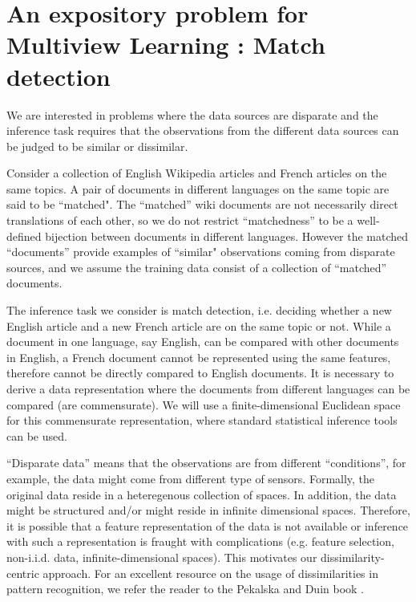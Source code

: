 \documentclass[12pt,oneside,final]{thesis}\usepackage[]{graphicx}\usepackage[]{color}
\begin{document}
\chapter{An expository problem for Multiview Learning : Match detection}
\label{sec:match detection}

 We are interested in problems where the data sources are disparate and the inference task requires that the observations from  the different data sources  can be judged to be similar or dissimilar.
  
	Consider a collection of  English Wikipedia articles  and   French articles on the same topics. A pair of documents in different languages on the same topic are said to be ``matched". The ``matched'' wiki documents are  not necessarily direct translations of each other, so  we do not restrict ``matchedness'' to be a well-defined bijection between documents in different languages.
	However the matched ``documents''  provide examples of  ``similar"  observations coming from disparate sources, and we assume the training data consist of  a collection of ``matched'' documents.
	
  The inference task we consider is match detection, i.e. deciding whether a new English article and a new French article are on the same topic or not. While  a document in one language, say English, can be compared with other documents in English, a  French document  cannot be represented using the same features, therefore cannot be directly compared to English documents.  It is necessary   to derive a data representation  where the  documents from different languages can be compared (are commensurate).  %
	We will use a finite-dimensional Euclidean space for  this commensurate representation, where standard  statistical inference tools can be used.
	
     ``Disparate data''  means that  the observations are from  different ``conditions'', for example, the data might come from different type of sensors. Formally, the original data  reside in a heteregenous collection of  spaces.  In addition, the data might be structured and/or might reside in  infinite dimensional spaces. Therefore, it is possible that a feature representation of the data is not available or inference with such a representation is fraught with complications (e.g. feature selection, non-i.i.d. data, infinite-dimensional spaces). This motivates our  dissimilarity-centric approach. For an excellent resource on the usage of dissimilarities in pattern recognition, we refer the reader to the Pekalska and Duin book \cite{duin2005dissimilarity}.
		
\end{document}
